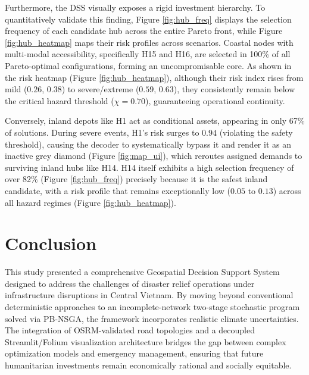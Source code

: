 \documentclass[conference]{IEEEtran}
\begin{document}
Furthermore, the DSS visually exposes a rigid investment hierarchy. To quantitatively validate this finding, Figure \ref{fig:hub_freq} displays the selection frequency of each candidate hub across the entire Pareto front, while Figure \ref{fig:hub_heatmap} maps their risk profiles across scenarios. Coastal nodes with multi-modal accessibility, specifically H15 and H16, are selected in 100\% of all Pareto-optimal configurations, forming an uncompromisable core. As shown in the risk heatmap (Figure \ref{fig:hub_heatmap}), although their risk index rises from mild ($0.26$, $0.38$) to severe/extreme ($0.59$, $0.63$), they consistently remain below the critical hazard threshold ($\chi = 0.70$), guaranteeing operational continuity.

Conversely, inland depots like H1 act as conditional assets, appearing in only 67\% of solutions. During severe events, H1's risk surges to $0.94$ (violating the safety threshold), causing the decoder to systematically bypass it and render it as an inactive grey diamond (Figure \ref{fig:map_ui}), which reroutes assigned demands to surviving inland hubs like H14. H14 itself exhibits a high selection frequency of over 82\% (Figure \ref{fig:hub_freq}) precisely because it is the safest inland candidate, with a risk profile that remains exceptionally low ($0.05$ to $0.13$) across all hazard regimes (Figure \ref{fig:hub_heatmap}).

\section{Conclusion}
This study presented a comprehensive Geospatial Decision Support System designed to address the challenges of disaster relief operations under infrastructure disruptions in Central Vietnam. By moving beyond conventional deterministic approaches to an incomplete-network two-stage stochastic program solved via PB-NSGA, the framework incorporates realistic climate uncertainties. The integration of OSRM-validated road topologies and a decoupled Streamlit/Folium visualization architecture bridges the gap between complex optimization models and emergency management, ensuring that future humanitarian investments remain economically rational and socially equitable.



\end{document}
